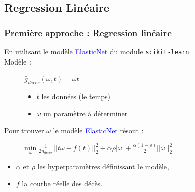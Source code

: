 \documentclass{beamer}
\begin{document}
\subsection{Regression Linéaire}
\begin{frame}
	\frametitle{Première approche : Regression linéaire}
	En utilisant le modèle \textcolor{blue}{ElasticNet} du module \texttt{scikit-learn}.\\
	\vspace{0.23 cm}
	Modèle :
	\begin{figure}[h]
		\begin{minipage}{0.3\textwidth}
			$\hat{g}_{deces} (\omega,t) = \omega t$
		\end{minipage}
		\begin{minipage}{0.5\textwidth}
			\begin{itemize}
				\item[] $t$ les données (le temps)
				\item[] $\omega$ un paramètre à déterminer
			\end{itemize}
		\end{minipage}
	\end{figure}
	\vspace{20pt}
	Pour trouver $\omega$ le modèle \textcolor{blue}{ElasticNet} résout :
	\begin{figure}[h]
		$\underset{\omega}{\mathrm{min}} \; \frac{1}{2n_{deces}}||t\omega- f(t)||^{2}_{2} + \alpha \rho |\omega| + \frac{\alpha (1-\rho)}{2}||\omega||^{2}_{2}$
		\\
	\end{figure}
	\begin{itemize}
		\item[]$\alpha$ et $\rho$ les hyperparamètres définissant le modèle,\\
		\item[]$f$ la courbe réelle des décès.
	\end{itemize}
\end{frame}
\end{document}
